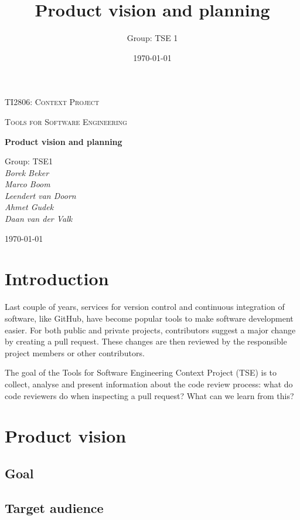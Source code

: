 \documentclass{article}
\title{Product vision and planning}
\author{Group: TSE 1}
\date{\today}
\begin{document}
\begin{titlepage}
	\centering
	{\scshape\LARGE TI2806: Context Project \par}
	\vspace{1cm}
	{\scshape\Large Tools for Software Engineering\par}
	\vspace{1.5cm}
	{\huge\bfseries Product vision and planning\par}
	\vspace{2cm}
	{\Large
	  Group: TSE1 \\
	  \vspace{0.5cm}
	  \itshape
        Borek Beker \\
        Marco Boom \\
        Leendert van Doorn \\
        Ahmet Gudek \\
        Daan van der Valk \\
    \par}

	\vfill

	{\large \today\par}
\end{titlepage}

\section{Introduction}
Last couple of years, services for version control and continuous integration of software, like GitHub, have become popular tools to make software development easier. For both public and private projects, contributors suggest a major change by creating a pull request. These changes are then reviewed by the responsible project members or other contributors.

The goal of the Tools for Software Engineering Context Project (TSE) is to collect, analyse and present information about the code review process: what do code reviewers do when inspecting a pull request? What can we learn from this?

\section{Product vision}
\subsection{Goal}
\subsection{Target audience}
\end{document}
